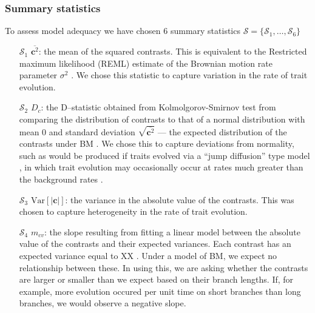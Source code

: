 \documentclass[12pt]{article}
\begin{document}
\subsubsection{Summary statistics}

To assess model adequacy we have chosen 6 summary statistics $\mathcal{S} = \lbrace \mathcal{S}_1, \ldots, \mathcal{S}_6 \rbrace$ 

\begin{enumerate}
\item[$\mathcal{S}_1$] $\overline{\mathbf{c}^2}$: the mean of the squared contrasts. This is equivalent to the Restricted maximum likelihood (REML) estimate of the Brownian motion rate parameter $\sigma^2$ \citep{Garland1992, Rohlf2001}. We chose this statistic to capture variation in the rate of trait evolution.

\item[$\mathcal{S}_2$] $D_c$: the D--statistic obtained from Kolmolgorov-Smirnov test \citep{ks} from comparing the distribution of contrasts to that of a normal distribution with mean 0 and standard deviation $\sqrt{\overline{\mathbf{c}^2}}$ --- the expected distribution of the contrasts under BM \citep{Felsenstein1985, Rohlf2001}. We chose this to capture deviations from normality, such as would be produced if traits evolved via a ``jump diffusion'' type model \citep{Landis2013, Eastmanjump}, in which trait evolution may occasionally occur at rates much greater than the background rates \citep[see][]{PennellPE}.

\item[$\mathcal{S}_3$] $\mathrm{Var}[| \mathbf{c} |]$: the variance in the absolute value of the contrasts. This was chosen to capture heterogeneity in the rate of trait evolution.

\item[$\mathcal{S}_4$] $m_{cv}$: the slope resulting from fitting a linear model between the absolute value of the contrasts and their expected variances. Each contrast has an expected variance equal to XX \citep{Felsenstein1985}. Under a model of BM, we expect no relationship between these. In using this, we are asking whether the contrasts are larger or smaller than we expect based on their branch lengths. If, for example, more evolution occured per unit time on short branches than long branches, we would observe a negative slope.


\end{enumerate}
\end{document}
